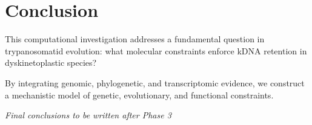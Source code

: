 \chapter{Conclusion}

This computational investigation addresses a fundamental question in trypanosomatid evolution: what molecular constraints enforce kDNA retention in dyskinetoplastic species?

By integrating genomic, phylogenetic, and transcriptomic evidence, we construct a mechanistic model of genetic, evolutionary, and functional constraints.

\textit{Final conclusions to be written after Phase 3}
